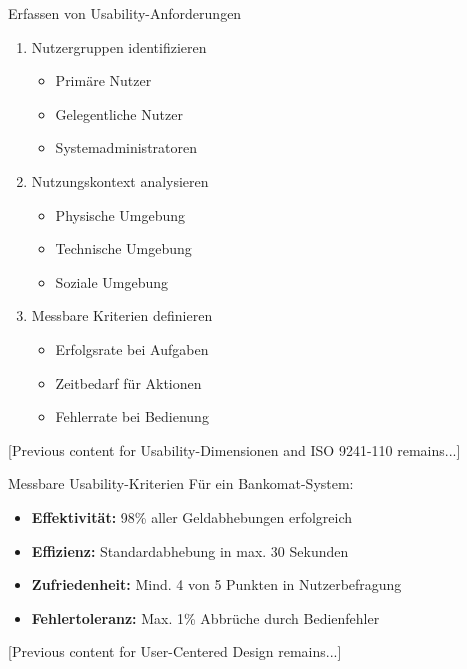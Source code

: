\begin{KR}{Erfassen von Usability-Anforderungen}
\begin{enumerate}
    \item Nutzergruppen identifizieren
    \begin{itemize}
        \item Primäre Nutzer
        \item Gelegentliche Nutzer
        \item Systemadministratoren
    \end{itemize}
    \item Nutzungskontext analysieren
    \begin{itemize}
        \item Physische Umgebung
        \item Technische Umgebung
        \item Soziale Umgebung
    \end{itemize}
    \item Messbare Kriterien definieren
    \begin{itemize}
        \item Erfolgsrate bei Aufgaben
        \item Zeitbedarf für Aktionen
        \item Fehlerrate bei Bedienung
    \end{itemize}
\end{enumerate}
\end{KR}

[Previous content for Usability-Dimensionen and ISO 9241-110 remains...]

\begin{example}{Messbare Usability-Kriterien}
Für ein Bankomat-System:
\begin{itemize}
    \item \textbf{Effektivität:} 98\% aller Geldabhebungen erfolgreich
    \item \textbf{Effizienz:} Standardabhebung in max. 30 Sekunden
    \item \textbf{Zufriedenheit:} Mind. 4 von 5 Punkten in Nutzerbefragung
    \item \textbf{Fehlertoleranz:} Max. 1\% Abbrüche durch Bedienfehler
\end{itemize}
\end{example}

[Previous content for User-Centered Design remains...]

